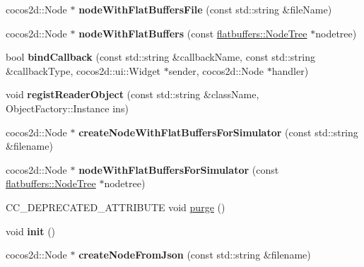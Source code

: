 \begin{DoxyCompactItemize}
\item 
\mbox{\label{classCSLoader_a1e0aae9c9796bc247bb7d9b25fa04bef}} 
cocos2d\+::\+Node $\ast$ {\bfseries node\+With\+Flat\+Buffers\+File} (const std\+::string \&file\+Name)
\item 
\mbox{\label{classCSLoader_a892e890276e375f88607aeb92b03bab2}} 
cocos2d\+::\+Node $\ast$ {\bfseries node\+With\+Flat\+Buffers} (const \hyperlink{structflatbuffers_1_1NodeTree}{flatbuffers\+::\+Node\+Tree} $\ast$nodetree)
\item 
\mbox{\label{classCSLoader_a8f9c027f62844f9279eff4e40a6ebc9a}} 
bool {\bfseries bind\+Callback} (const std\+::string \&callback\+Name, const std\+::string \&callback\+Type, cocos2d\+::ui\+::\+Widget $\ast$sender, cocos2d\+::\+Node $\ast$handler)
\item 
\mbox{\label{classCSLoader_a6489d9b3a2b2e8eed76269d46dd28af2}} 
void {\bfseries regist\+Reader\+Object} (const std\+::string \&class\+Name, Object\+Factory\+::\+Instance ins)
\item 
\mbox{\label{classCSLoader_ab24435a2070f6075a3e50d2811c8bb89}} 
cocos2d\+::\+Node $\ast$ {\bfseries create\+Node\+With\+Flat\+Buffers\+For\+Simulator} (const std\+::string \&filename)
\item 
\mbox{\label{classCSLoader_aa23a7ef8558e6b83cc5126be4cef2a59}} 
cocos2d\+::\+Node $\ast$ {\bfseries node\+With\+Flat\+Buffers\+For\+Simulator} (const \hyperlink{structflatbuffers_1_1NodeTree}{flatbuffers\+::\+Node\+Tree} $\ast$nodetree)
\item 
C\+C\+\_\+\+D\+E\+P\+R\+E\+C\+A\+T\+E\+D\+\_\+\+A\+T\+T\+R\+I\+B\+U\+TE void \hyperlink{classCSLoader_aef90831844e5aa1b8c4b751ed2606b4c}{purge} ()
\item 
\mbox{\label{classCSLoader_a82d87a1f1978e23a2b96765fd1975264}} 
void {\bfseries init} ()
\item 
\mbox{\label{classCSLoader_a266256eb7eaa9e61844d24a2d2056926}} 
cocos2d\+::\+Node $\ast$ {\bfseries create\+Node\+From\+Json} (const std\+::string \&filename)
\item 
\mbox{\label{classCSLoader_a41fd5ef5fb8a1f3369cce3ad8e88cf8e}} 

\end{DoxyCompactItemize}
